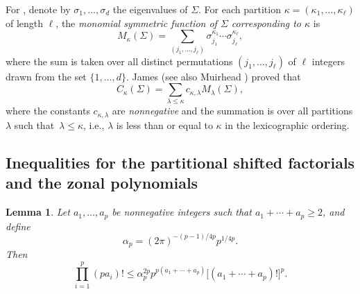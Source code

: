 \documentclass[11pt]{article}
\numberwithin{equation}{section}
\numberwithin{equation}{section}
\newtheorem{Lemma}[Theorem]{Lemma}
\def\R {\mathbb{R}}
\newcommand{\sym}{{{\hskip-1pt}\mathop{\mathrm{sym}}}}
\begin{document}
For \smash{$\Sigma \in \R^{d \times d}_\sym$}, denote by $\sigma_1,\ldots,\sigma_d$ the eigenvalues of $\Sigma$. For each partition $\kappa = (\kappa_1,\ldots,\kappa_\ell)$ of length $\ell$, the {\it monomial symmetric function of $\Sigma$ corresponding to $\kappa$} is
\begin{equation}
\label{eq_msf}
M_\kappa(\Sigma) = \sum_{(j_1,\ldots,j_\ell)} \sigma_{j_1}^{\kappa_1} \cdots \sigma_{j_\ell}^{\kappa_\ell},
\end{equation}
where the sum is taken over all distinct permutations $(j_1,\ldots,j_\ell)$ of $\ell$ integers drawn from the set $\{1,\ldots,d\}$. James \cite{James68} (see also Muirhead \cite[Section 7.2]{Muirhead}) proved that
\begin{equation}
\label{eq_zonal_msf}
C_\kappa(\Sigma) = \sum_{\lambda \le \kappa} c_{\kappa,\lambda} M_\lambda(\Sigma),
\end{equation}
where the constants $c_{\kappa,\lambda}$ are \textit{nonnegative} and the summation is over all partitions $\lambda$ such that~${\lambda \le \kappa}$, i.e., $\lambda$ is less than or equal to $\kappa$ in the lexicographic ordering.


\subsection[Inequalities for the partitional shifted factorials and the zonal polynomials]{Inequalities for the partitional shifted factorials\\ and the zonal polynomials}
\label{sec_ineqs}

\begin{Lemma}
\label{lemma_factorial_ineq}
Let $a_1,\ldots,a_p$ be nonnegative integers such that $a_1+\cdots+a_p\ge 2$, and define
\begin{equation}
\label{eq_alpha_p}
\alpha_p = (2\pi)^{-(p-1)/4p} p^{1/4p}.
\end{equation}
Then
\begin{equation}
\label{eq_prod_factorial_bound}
\prod_{i=1}^p (p a_i)! \le \alpha_p^{2p} p^{p(a_1+\cdots+a_p)} \bigl[(a_1+\cdots+a_p)!\bigr]^p.
\end{equation}
\end{Lemma}
\end{document}
